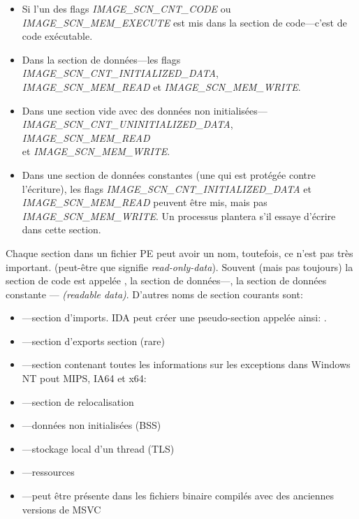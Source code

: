 \begin{itemize}
\item Si l'un des flags \emph{IMAGE\_SCN\_CNT\_CODE} ou \emph{IMAGE\_SCN\_MEM\_EXECUTE}
est mis dans la section de code---c'est de code exécutable.

\item Dans la section de données---les flags \emph{IMAGE\_SCN\_CNT\_INITIALIZED\_DATA},\\
\emph{IMAGE\_SCN\_MEM\_READ} et \emph{IMAGE\_SCN\_MEM\_WRITE}.

\item Dans une section vide avec des données non initialisées---\\
\emph{IMAGE\_SCN\_CNT\_UNINITIALIZED\_DATA}, \emph{IMAGE\_SCN\_MEM\_READ} \\
et \emph{IMAGE\_SCN\_MEM\_WRITE}.

\item Dans une section de données constantes (une qui est protégée contre l'écriture),
les flags \emph{IMAGE\_SCN\_CNT\_INITIALIZED\_DATA} et \emph{IMAGE\_SCN\_MEM\_READ} peuvent
être mis, mais pas \emph{IMAGE\_SCN\_MEM\_WRITE}.
Un processus plantera s'il essaye d'écrire dans cette section.
\end{itemize}

Chaque section dans un fichier PE peut avoir un nom, toutefois, ce n'est pas très
important.
(peut-être que  signifie \emph{read-only-data}).
Souvent (mais pas toujours) la section de code est appelée , la section
de données---, la section de données constante ---  \emph{(readable data)}.
D'autres noms de section courants sont:

\begin{itemize}
\item {}---section d'imports.
\ac{IDA} peut créer une pseudo-section appelée ainsi: .
\item {}---section d'exports section (rare)
\item {}---section contenant toutes les informations sur les exceptions
dans Windows NT pout MIPS, \ac{IA64} et x64: 
\item {}---section de relocalisation
\item {}---données non initialisées (\ac{BSS})
\item {}---stockage local d'un thread (\ac{TLS})
\item {}---ressources
\item {}---peut être présente dans les fichiers binaire compilés avec des
anciennes versions de MSVC
\end{itemize}

